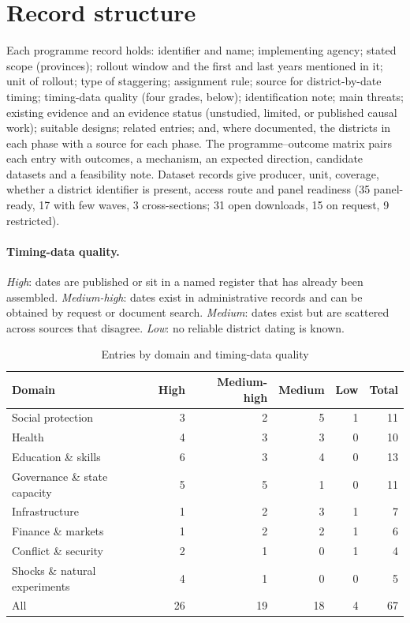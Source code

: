 \documentclass[11pt]{article}
\begin{document}
\section{Record structure}
Each programme record holds: identifier and name; implementing agency; stated scope (provinces); rollout window and the first and last years mentioned in it; unit of rollout; type of staggering; assignment rule; source for district-by-date timing; timing-data quality (four grades, below); identification note; main threats; existing evidence and an evidence status (unstudied, limited, or published causal work); suitable designs; related entries; and, where documented, the districts in each phase with a source for each phase. The programme--outcome matrix pairs each entry with outcomes, a mechanism, an expected direction, candidate datasets and a feasibility note. Dataset records give producer, unit, coverage, whether a district identifier is present, access route and panel readiness (35 panel-ready, 17 with few waves, 3 cross-sections; 31 open downloads, 15 on request, 9 restricted).

\paragraph{Timing-data quality.} \emph{High}: dates are published or sit in a named register that has already been assembled. \emph{Medium-high}: dates exist in administrative records and can be obtained by request or document search. \emph{Medium}: dates exist but are scattered across sources that disagree. \emph{Low}: no reliable district dating is known.

\begin{table}[ht]\centering\small
\caption{Entries by domain and timing-data quality}
\begin{tabular}{lrrrrr}\toprule
Domain & High & Medium-high & Medium & Low & Total\\\midrule
Social protection & 3 & 2 & 5 & 1 & 11 \\
Health & 4 & 3 & 3 & 0 & 10 \\
Education \& skills & 6 & 3 & 4 & 0 & 13 \\
Governance \& state capacity & 5 & 5 & 1 & 0 & 11 \\
Infrastructure & 1 & 2 & 3 & 1 & 7 \\
Finance \& markets & 1 & 2 & 2 & 1 & 6 \\
Conflict \& security & 2 & 1 & 0 & 1 & 4 \\
Shocks \& natural experiments & 4 & 1 & 0 & 0 & 5 \\
\midrule
All & 26 & 19 & 18 & 4 & 67 \\
\bottomrule\end{tabular}
\end{table}
\end{document}
